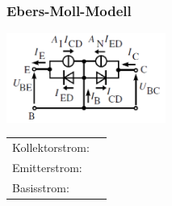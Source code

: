 	\subsubsection{Ebers-Moll-Modell}
		\begin{minipage}[c]{6cm}
			\includegraphics[width=5.2cm]{images/bipolar-EbersMoll}
		\end{minipage}
		\begin{minipage}[c]{8cm} 
			\begin{tabular}{l l}
			Kollektorstrom: & \fbox{$I_C=A_NI_{E_{sat}}\left(e^{\frac{U_{BE}}{U_T}}-1\right)
			 -I_{C_{sat}}\left(e^{\frac{U_{BC}}{U_T}}-1\right)$ }\\
			Emitterstrom: & \rule{0pt}{6ex}\fbox{$I_E=I_{E_{sat}}\left(e^{\frac{U_{BE}}{U_T}}-1\right)
			 -A_II_{C_{sat}}\left(e^{\frac{U_{BC}}{U_T}}-1\right)$} \\
			Basisstrom: & \rule{0pt}{4ex}\fbox{$I_B=I_E-I_C$} \\
			\end{tabular} 
		\end{minipage}
	
